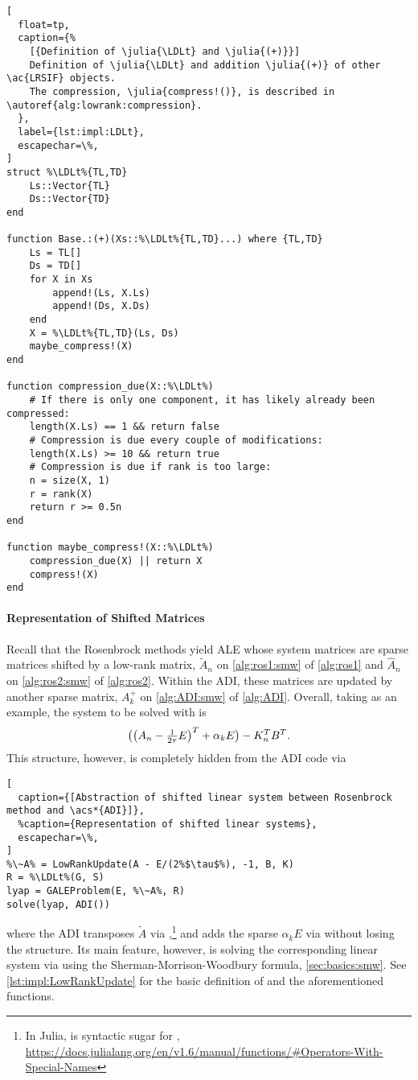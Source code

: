 \begin{lstlisting}[
  float=tp,
  caption={%
    [{Definition of \julia{\LDLt} and \julia{(+)}}]
    Definition of \julia{\LDLt} and addition \julia{(+)} of other \ac{LRSIF} objects.
    The compression, \julia{compress!()}, is described in \autoref{alg:lowrank:compression}.
  },
  label={lst:impl:LDLt},
  escapechar=\%,
]
struct %\LDLt%{TL,TD}
    Ls::Vector{TL}
    Ds::Vector{TD}
end

function Base.:(+)(Xs::%\LDLt%{TL,TD}...) where {TL,TD}
    Ls = TL[]
    Ds = TD[]
    for X in Xs
        append!(Ls, X.Ls)
        append!(Ds, X.Ds)
    end
    X = %\LDLt%{TL,TD}(Ls, Ds)
    maybe_compress!(X)
end

function compression_due(X::%\LDLt%)
    # If there is only one component, it has likely already been compressed:
    length(X.Ls) == 1 && return false
    # Compression is due every couple of modifications:
    length(X.Ls) >= 10 && return true
    # Compression is due if rank is too large:
    n = size(X, 1)
    r = rank(X)
    return r >= 0.5n
end

function maybe_compress!(X::%\LDLt%)
    compression_due(X) || return X
    compress!(X)
end
\end{lstlisting}

\paragraph{Representation of Shifted Matrices}

Recall that the Rosenbrock methods yield \ac{ALE} whose system matrices are sparse matrices shifted by a low-rank matrix,
\cf $\tilde A_n$ on \autoref{alg:ros1:smw} of \autoref{alg:ros1} and $\hat A_n$ on \autoref{alg:ros2:smw} of \autoref{alg:ros2}.
Within the \ac{ADI}, these matrices are updated by another sparse matrix,
\cf $A^+_k$ on \autoref{alg:ADI:smw} of \autoref{alg:ADI}.
Overall, taking  as an example,
the system to be solved with is
\begin{equation}
  \big(\big( A_n - \tfrac{1}{2\tau} E \big)^T + \alpha_k E \big) - K_n^T B^T
  .
\end{equation}
This structure, however, is completely hidden from the \ac{ADI} code via
\begin{lstlisting}[
  caption={[Abstraction of shifted linear system between Rosenbrock method and \acs*{ADI}]},
  %caption={Representation of shifted linear systems},
  escapechar=\%,
]
%\~A% = LowRankUpdate(A - E/(2%$\tau$%), -1, B, K)
R = %\LDLt%(G, S)
lyap = GALEProblem(E, %\~A%, R)
solve(lyap, ADI())
\end{lstlisting}
where the \ac{ADI} transposes $\tilde A$ via ,\footnote{%
  In Julia,  is syntactic sugar for ,
  \cf \url{https://docs.julialang.org/en/v1.6/manual/functions/\#Operators-With-Special-Names}
}
and adds the sparse $\alpha_k E$ via \julia{(+)} without losing the  structure.
Its main feature, however, is solving the corresponding linear system via \julia{(\textbackslash)}
using the Sherman-Morrison-Woodbury formula,
\cf \autoref{sec:basics:smw}.
See \autoref{lst:impl:LowRankUpdate} for the basic definition of  and the aforementioned functions.

